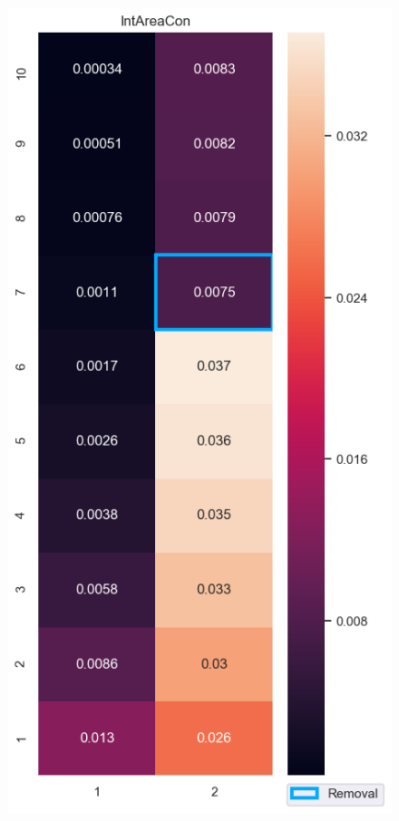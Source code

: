 \begin{figure}[ht]
\begin{minipage}{.5\textwidth}
  \label{fig:MultiChanBubRemoval_problem}
\end{minipage}%
\begin{minipage}{.5\textwidth}
  \centering
  \includegraphics[width=1\linewidth]{images/IntAreaConHeatMap.png}
  \label{fig:IntAreaConHeatMap}
\end{minipage}
\end{figure}

